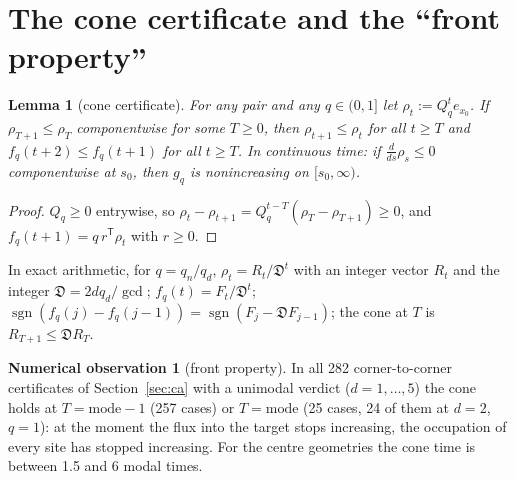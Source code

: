 \documentclass[11pt,a4paper]{article}
\newtheorem{lemma}[theorem]{Lemma}
\theoremstyle{definition}
\newtheorem{observation}[theorem]{Numerical observation}
\newcommand{\sgn}{\operatorname{sgn}}
\newcommand{\T}{^{\mathsf T}}
\newcommand{\fD}{\mathfrak D}
\begin{document}
\section{The cone certificate and the ``front property''}\label{sec:cone}

\begin{lemma}[cone certificate]\label{lem:cone}
For any pair and any $q\in(0,1]$ let $\rho_t:=Q_q^te_{x_0}$. If $\rho_{T+1}\le\rho_T$ componentwise for some $T\ge0$, then $\rho_{t+1}\le\rho_t$ for all $t\ge T$ and $f_q(t+2)\le f_q(t+1)$ for all $t\ge T$. In continuous time: if $\frac{d}{ds}\rho_s\le0$ componentwise at $s_0$, then $g_q$ is nonincreasing on $[s_0,\infty)$.
\end{lemma}
\begin{proof}
$Q_q\ge0$ entrywise, so $\rho_t-\rho_{t+1}=Q_q^{t-T}(\rho_T-\rho_{T+1})\ge0$, and $f_q(t+1)=q\,r\T\rho_t$ with $r\ge0$.
\end{proof}

In exact arithmetic, for $q=q_n/q_d$, $\rho_t=R_t/\fD^t$ with an integer vector $R_t$ and the integer $\fD=2dq_d/\gcd$; $f_q(t)=F_t/\fD^t$; $\sgn(f_q(j)-f_q(j-1))=\sgn(F_j-\fD F_{j-1})$; the cone at $T$ is $R_{T+1}\le\fD R_T$.

\begin{observation}[front property]\label{obs:front}
In all 282 corner-to-corner certificates of Section~\ref{sec:ca} with a unimodal verdict ($d=1,\dots,5$) the cone holds at $T=\text{mode}-1$ (257 cases) or $T=\text{mode}$ (25 cases, 24 of them at $d=2$, $q=1$): at the moment the flux into the target stops increasing, the occupation of every site has stopped increasing. For the centre geometries the cone time is between 1.5 and 6 modal times.
\end{observation}
\end{document}
